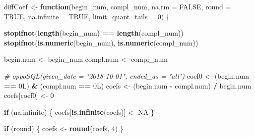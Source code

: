 \documentclass[]{article}
\newenvironment{Shaded}{\begin{snugshade}}{\end{snugshade}}
\newcommand{\CommentTok}[1]{\textcolor[rgb]{0.56,0.35,0.01}{\textit{#1}}}
\newcommand{\ControlFlowTok}[1]{\textcolor[rgb]{0.13,0.29,0.53}{\textbf{#1}}}
\newcommand{\DataTypeTok}[1]{\textcolor[rgb]{0.13,0.29,0.53}{#1}}
\newcommand{\DecValTok}[1]{\textcolor[rgb]{0.00,0.00,0.81}{#1}}
\newcommand{\KeywordTok}[1]{\textcolor[rgb]{0.13,0.29,0.53}{\textbf{#1}}}
\newcommand{\NormalTok}[1]{#1}
\newcommand{\OperatorTok}[1]{\textcolor[rgb]{0.81,0.36,0.00}{\textbf{#1}}}
\newcommand{\OtherTok}[1]{\textcolor[rgb]{0.56,0.35,0.01}{#1}}
\newcommand{\StringTok}[1]{\textcolor[rgb]{0.31,0.60,0.02}{#1}}
\begin{document}
\begin{Shaded}
\begin{Highlighting}[]
\NormalTok{diffCoef <-}\StringTok{ }\ControlFlowTok{function}\NormalTok{(begin_num,}
\NormalTok{                        compl_num,}
                        \DataTypeTok{na.rm =} \OtherTok{FALSE}\NormalTok{,}
                        \DataTypeTok{round =} \OtherTok{TRUE}\NormalTok{,}
                        \DataTypeTok{na.infinite =} \OtherTok{TRUE}\NormalTok{,}
                        \DataTypeTok{limit_quant_tails =} \DecValTok{0}\NormalTok{) \{}
    
    \KeywordTok{stopifnot}\NormalTok{(}\KeywordTok{length}\NormalTok{(begin_num) }\OperatorTok{==}\StringTok{ }\KeywordTok{length}\NormalTok{(compl_num))}
    \KeywordTok{stopifnot}\NormalTok{(}\KeywordTok{is.numeric}\NormalTok{(begin_num), }\KeywordTok{is.numeric}\NormalTok{(compl_num))}
    
\NormalTok{    begin.num <-}\StringTok{ }\NormalTok{begin_num}
\NormalTok{    compl.num <-}\StringTok{ }\NormalTok{compl_num}
    
    \CommentTok{# oppoSQL(given_date = "2018-10-01", ended_as = "all")}
\NormalTok{    coef0 <-}\StringTok{ }\NormalTok{(begin.num }\OperatorTok{==}\StringTok{ }\NormalTok{0L) }\OperatorTok{&}\StringTok{ }\NormalTok{(compl.num }\OperatorTok{==}\StringTok{ }\NormalTok{0L)}
\NormalTok{    coefs <-}\StringTok{ }\NormalTok{(begin.num }\OperatorTok{-}\StringTok{ }\NormalTok{compl.num) }\OperatorTok{/}\StringTok{ }\NormalTok{begin.num}
\NormalTok{    coefs[coef0] <-}\StringTok{ }\DecValTok{0}
    
    \ControlFlowTok{if}\NormalTok{ (na.infinite) \{}
\NormalTok{        coefs[}\KeywordTok{is.infinite}\NormalTok{(coefs)] <-}\StringTok{ }\OtherTok{NA}
\NormalTok{    \}}
    
    \ControlFlowTok{if}\NormalTok{ (round) \{}
\NormalTok{        coefs <-}\StringTok{ }\KeywordTok{round}\NormalTok{(coefs, }\DecValTok{4}\NormalTok{)}
\NormalTok{    \}}


\end{Highlighting}
\end{Shaded}
\end{document}
